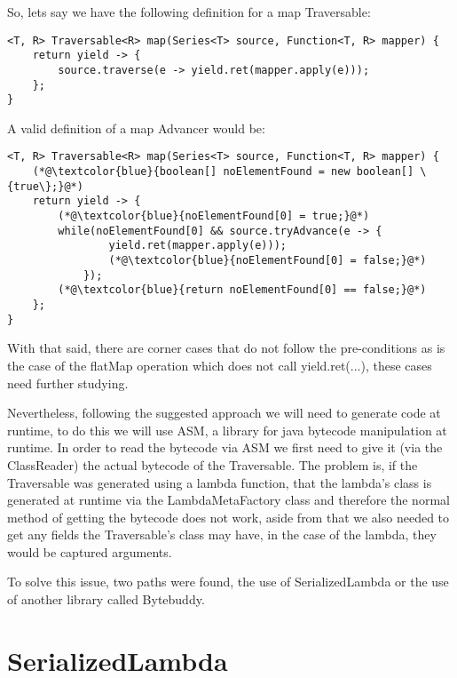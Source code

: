 So, lets say we have the following definition for a map Traversable:
\begin{lstlisting}[caption={Map Traversable},captionpos=b]
<T, R> Traversable<R> map(Series<T> source, Function<T, R> mapper) {
	return yield -> {
    	source.traverse(e -> yield.ret(mapper.apply(e)));
	};
}
\end{lstlisting}

A valid definition of a map Advancer would be:

\begin{lstlisting}[caption={Map Traversable},captionpos=b]
<T, R> Traversable<R> map(Series<T> source, Function<T, R> mapper) {
	(*@\textcolor{blue}{boolean[] noElementFound = new boolean[] \{true\};}@*)
	return yield -> {
		(*@\textcolor{blue}{noElementFound[0] = true;}@*)
		while(noElementFound[0] && source.tryAdvance(e -> {
				yield.ret(mapper.apply(e)));
				(*@\textcolor{blue}{noElementFound[0] = false;}@*)
			});
		(*@\textcolor{blue}{return noElementFound[0] == false;}@*)
	};
}
\end{lstlisting}

With that said, there are corner cases that do not follow the pre-conditions as is the case of the flatMap operation which does not call yield.ret(...), these cases need further studying.

Nevertheless, following the suggested approach we will need to generate code at runtime, to do this we will use ASM, a library for java bytecode manipulation at runtime. In order to read the bytecode via ASM we first need to give it (via the ClassReader) the actual bytecode of the Traversable. The problem is, if the Traversable was generated using a lambda function, that the lambda's class is generated at runtime via the LambdaMetaFactory class and therefore the normal method of getting the bytecode does not work, aside from that we also needed to get any fields the Traversable's class may have, in the case of the lambda, they would be captured arguments.

To solve this issue, two paths were found\citep{stackoverflowlambdacode}, the use of SerializedLambda\citep{serializedlambda} or the use of another library called Bytebuddy.

\section{SerializedLambda}

